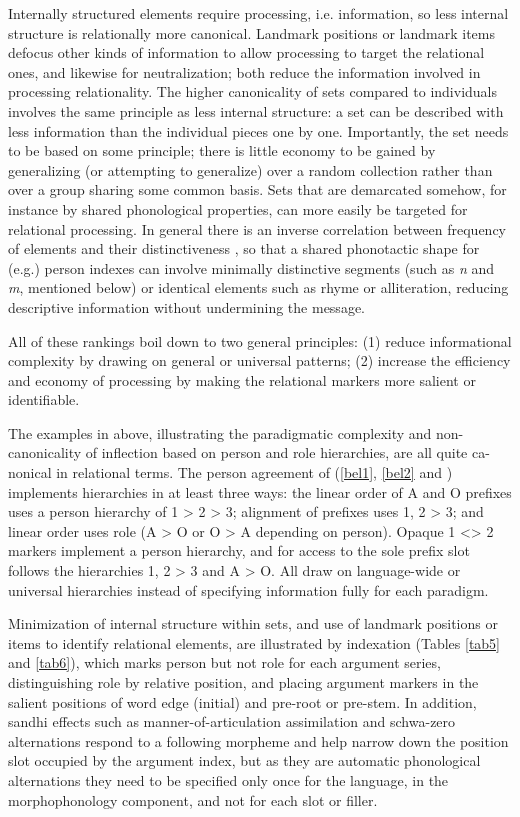 \documentclass[output=paper,hidelinks]{langscibook}
\begin{document}
Internally structured elements require processing, i.e. information, so less internal structure is relationally more canonical.   Landmark positions or landmark items defocus other kinds of information to allow processing to target the relational ones, and likewise for neutralization; both reduce the information involved in processing relationality.  The higher canonicality of sets compared to individuals involves the same principle as less internal structure: a set can be described with less information than the individual pieces one by one.  Importantly, the set needs to be based on some principle; there is little economy to be gained by generalizing (or attempting to generalize) over a random collection rather than over a group sharing some common basis.  Sets that are demarcated somehow, for instance by shared phonological properties, can more easily be targeted for relational processing.  In general there is an inverse correlation between frequency of elements and their distinctiveness \citep[100--129]{Meylan2018}, so that a shared phonotactic shape for (e.g.) person indexes can involve minimally distinctive segments (such as \textit{n} and \textit{m}, mentioned below) or identical elements such as rhyme or alliteration, reducing descriptive information without undermining the message.

All of these rankings boil down to two general principles: (1) reduce informational complexity by drawing on general or universal patterns; (2) increase the efficiency and economy of processing by making the relational markers more salient or identifiable.

The examples in  above, illustrating the paradigmatic complexity and non-canonicality of inflection based on person and role hierarchies, are all quite ca-nonical in relational terms.  The person agreement of  (\ref{bel1}, \ref{bel2} and ) implements hierarchies in at least three ways:  the linear order of A and O prefixes uses a person hierarchy of 1 > 2 > 3; alignment of prefixes uses 1, 2 > 3; and linear order uses role (A > O or O > A depending on person).  Opaque 1 <> 2 markers implement a person hierarchy, and for   access to the sole prefix slot follows the hierarchies 1, 2 > 3 and A > O.  All draw on language-wide or universal hierarchies instead of specifying information fully for each paradigm.

Minimization of internal structure within sets, and use of landmark positions or items to identify relational elements, are illustrated by  indexation (Tables \ref{tab5} and \ref{tab6}), which marks person but not role for each argument series, distinguishing role by relative position, and placing argument markers in the salient positions of word edge (initial) and pre-root or pre-stem.  In addition, sandhi effects such as manner-of-articulation assimilation and schwa-zero alternations respond to a following morpheme and help narrow down the position slot occupied by the argument index, but as they are automatic phonological alternations they need to be specified only once for the language, in the morphophonology component, and not for each slot or filler.
\end{document}
